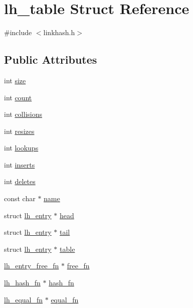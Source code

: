 \hypertarget{structlh__table}{}\section{lh\+\_\+table Struct Reference}
\label{structlh__table}


{\ttfamily \#include $<$linkhash.\+h$>$}

\subsection*{Public Attributes}
\begin{DoxyCompactItemize}
\item 
int \hyperlink{structlh__table_ae251575ec2935bcb0e0589ca8e243839}{size}
\item 
int \hyperlink{structlh__table_aa172ed8fe205367b54e0e2cdf9ea8c6c}{count}
\item 
int \hyperlink{structlh__table_a9458e41d842ce40cd37dc13458ced133}{collisions}
\item 
int \hyperlink{structlh__table_ab4cde49bd9ce7a07daaf99af34ddb67e}{resizes}
\item 
int \hyperlink{structlh__table_afd0385c645413d26e682f725a6f52164}{lookups}
\item 
int \hyperlink{structlh__table_afd64becd0d2cfbc91a4c9c9a117498b9}{inserts}
\item 
int \hyperlink{structlh__table_a8348bdd7e61c8d72b402f6a152013fbf}{deletes}
\item 
const char $\ast$ \hyperlink{structlh__table_aebf4001cde3746ec8025c1d87d4e6279}{name}
\item 
struct \hyperlink{structlh__entry}{lh\+\_\+entry} $\ast$ \hyperlink{structlh__table_aa7d986a3b12a9fa47e349713794c30fb}{head}
\item 
struct \hyperlink{structlh__entry}{lh\+\_\+entry} $\ast$ \hyperlink{structlh__table_a479895e45db2bdf9bf5d173fa4b7e277}{tail}
\item 
struct \hyperlink{structlh__entry}{lh\+\_\+entry} $\ast$ \hyperlink{structlh__table_a4fd9c5aba38791b26ab0ec614a5caf8f}{table}
\item 
\hyperlink{linkhash_8h_a481b0bb1ab1d6a83713d9c27aa9f07d2}{lh\+\_\+entry\+\_\+free\+\_\+fn} $\ast$ \hyperlink{structlh__table_a30ea5903f4f8126abd6aa489ffe14737}{free\+\_\+fn}
\item 
\hyperlink{linkhash_8h_a91d16eb45069d235a198d2184a77d0ae}{lh\+\_\+hash\+\_\+fn} $\ast$ \hyperlink{structlh__table_a1488d1a4a320b1a9bb2f441859544be1}{hash\+\_\+fn}
\item 
\hyperlink{linkhash_8h_af74a0690267598a0ed6f0a9b66674573}{lh\+\_\+equal\+\_\+fn} $\ast$ \hyperlink{structlh__table_aa646c287a6a46e09da6c7457c981a359}{equal\+\_\+fn}
\end{DoxyCompactItemize}


